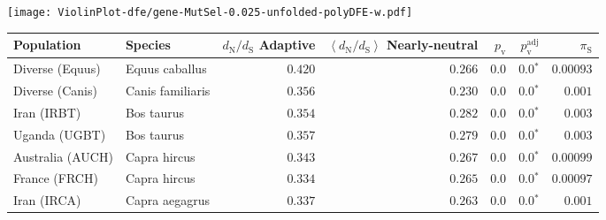 \begin{center}
\begin{adjustbox}{width = 1\textwidth}
\begin{tabular}{|l|l|r|r|r|r|r|r|r|}
\bottomrule
\end{tabular}
\end{adjustbox}
\newpage
\texttt{[image: ViolinPlot-dfe/gene-MutSel-0.025-unfolded-polyDFE-w.pdf]} 
\begin{adjustbox}{width = 1\textwidth}
\begin{tabular}{|l|l|r|r|r|r|r|}
\toprule
                     Population &              Species & \specialcell{$d_{\mathrm{N}} / d_{\mathrm{S}}$ \\ Adaptive} & \specialcell{$\left< d_{\mathrm{N}} / d_{\mathrm{S}} \right>$ \\ Nearly-neutral} & $p_{\mathrm{v}}$ & $p_{\mathrm{v}}^{\mathrm{adj}}$ & $\pi_{\textrm{S}}$ \\
\midrule
                Diverse (Equus) &       Equus caballus &                                           $ 0.420$ &                                           $ 0.266$ &            $0.0$ &                  $\bm{0.0{^*}}$ &          $0.00093$ \\
                Diverse (Canis) &     Canis familiaris &                                           $ 0.356$ &                                           $ 0.230$ &            $0.0$ &                  $\bm{0.0{^*}}$ &           $ 0.001$ \\
                    Iran (IRBT) &           Bos taurus &                                           $ 0.354$ &                                           $ 0.282$ &            $0.0$ &                  $\bm{0.0{^*}}$ &           $ 0.003$ \\
                  Uganda (UGBT) &           Bos taurus &                                           $ 0.357$ &                                           $ 0.279$ &            $0.0$ &                  $\bm{0.0{^*}}$ &           $ 0.003$ \\
               Australia (AUCH) &         Capra hircus &                                           $ 0.343$ &                                           $ 0.267$ &            $0.0$ &                  $\bm{0.0{^*}}$ &          $0.00099$ \\
                  France (FRCH) &         Capra hircus &                                           $ 0.334$ &                                           $ 0.265$ &            $0.0$ &                  $\bm{0.0{^*}}$ &          $0.00097$ \\
                    Iran (IRCA) &       Capra aegagrus &                                           $ 0.337$ &                                           $ 0.263$ &            $0.0$ &                  $\bm{0.0{^*}}$ &           $ 0.001$ \\

\end{tabular}
\end{adjustbox}
\end{center}
